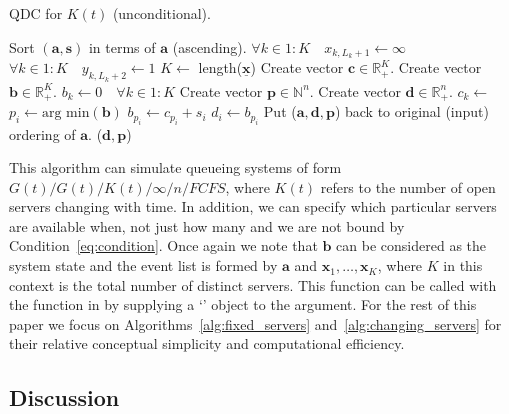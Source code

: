 \documentclass[article]{jss}
\begin{document}
\begin{algorithm}[t!]
\caption{QDC for $K(t)$ (unconditional).}
\label{alg:changing_servers_unconditional} 
\begin{algorithmic}[1]
\State Sort $(\mathbf{a}, \mathbf{s})$ in terms of $\mathbf{a}$ (ascending).
\State $\forall k \in 1:K \quad x_{k,L_k+1} \leftarrow \infty$
\State $\forall k \in 1:K \quad y_{k,L_k+2} \leftarrow 1$
\State $K \leftarrow $ length($\mathbf{\underline{x}}$)
\State Create vector $\mathbf{c} \in \mathbb{R}_{\text{+}}^{K}$.
\State Create vector $\mathbf{b} \in \mathbb{R}_{\text{+}}^{K}$.
\State $b_k \leftarrow 0 \quad \forall k \in 1:K$
\State Create vector $\mathbf{p} \in \mathbb{N}^{n}$.
\State Create vector $\mathbf{d} \in \mathbb{R}_{+}^{n}$.
        \State $c_k \leftarrow$ 
    \EndFor
\State $p_i \leftarrow \text{arg min}(\mathbf{b}) $
\State $b_{p_i} \leftarrow c_{p_i} + s_i $
\State $d_i \leftarrow b_{p_i}$ 
\EndFor 
\State Put ($\mathbf{a}, \mathbf{d}, \mathbf{p}$) back to original (input) ordering of $\mathbf{a}$.
\State \Return ($\mathbf{d}, \mathbf{p}$)
\EndFunction
\end{algorithmic}
\end{algorithm}

This algorithm can simulate queueing systems of form
$G(t)/G(t)/K(t)/\infty/n/\mathit{FCFS}$, where $K(t)$ refers to the
number of open servers changing with time. In addition, we can specify
which particular servers are available when, not just how many and we
are not bound by Condition~\ref{eq:condition}. Once again we note that
$\mathbf{b}$ can be considered as the system state and the event list
is formed by $\mathbf{a}$ and $\mathbf{x}_1, \dots, \mathbf{x}_K$, where 
$K$ in this context is the total number of distinct servers.
This function can be called with the
 function in  by supplying a
`' object to the  argument. For the rest
of this paper we focus on Algorithms~\ref{alg:fixed_servers}
and~\ref{alg:changing_servers} for their relative conceptual
simplicity and computational efficiency.

\subsection{Discussion}
\end{document}
